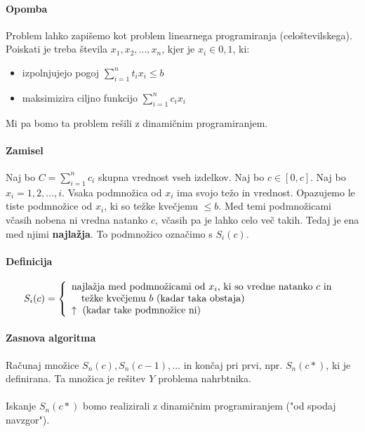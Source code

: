 \documentclass[a4paper,10pt]{article}
\begin{document}
\paragraph{Opomba}
Problem lahko zapi\v semo kot problem linearnega programiranja (celo\v stevilskega). Poiskati je treba \v stevila $x_1, x_2,..., x_n$, kjer je $x_i \in {0, 1}$, ki:
\begin{itemize}
\item izpolnjujejo pogoj $\sum_{i=1}^{n}t_i x_i \leq b$
\item maksimizira ciljno funkcijo $\sum_{i=1}^{n}c_i x_i$
\end{itemize}
Mi pa bomo ta problem re\v sili z dinami\v cnim programiranjem.

\paragraph{Zamisel}
Naj bo $C = \sum_{i=1}^n c_i$ skupna vrednost vseh izdelkov. Naj bo $c \in [0, c]$. Naj bo $x_i = {1, 2,..., i}$. Vsaka podmno\v zica od $x_i$ ima svojo te\v zo in vrednost. Opazujemo le tiste podmno\v zice od $x_i$, ki so te\v zke kve\v cjemu $\leq b$. Med temi podmno\v zicami v\v casih nobena ni vredna natanko $c$, v\v casih pa je lahko celo ve\v c takih. Tedaj je ena med njimi \textbf{najla\v zja}. To podmno\v zico ozna\v cimo s $S_i(c)$.

\paragraph{Definicija}
$$
S_i(c) =
\left\lbrace
\begin{array}{l}
\mbox{najla\v zja med podmno\v zicami od } x_i \mbox{, ki so vredne natanko } c \mbox{ in }\\
\hspace*{10pt} \mbox{te\v zke kve\v cjemu } b \mbox{ (kadar taka obstaja)}\\
\uparrow \mbox{ (kadar take podmno\v zice ni)}
\end{array}
\right.
$$

\paragraph{Zasnova algoritma}
Ra\v cunaj mno\v zice $S_n(c), S_n(c-1),...$ in kon\v caj pri prvi, npr. $S_n(c*)$, ki je definirana. Ta mno\v zica je re\v sitev $Y$ problema nahrbtnika.\\
\\
Iskanje $S_n(c*)$ bomo realizirali z dinami\v cnim programiranjem ("od spodaj navzgor").
\end{document}
